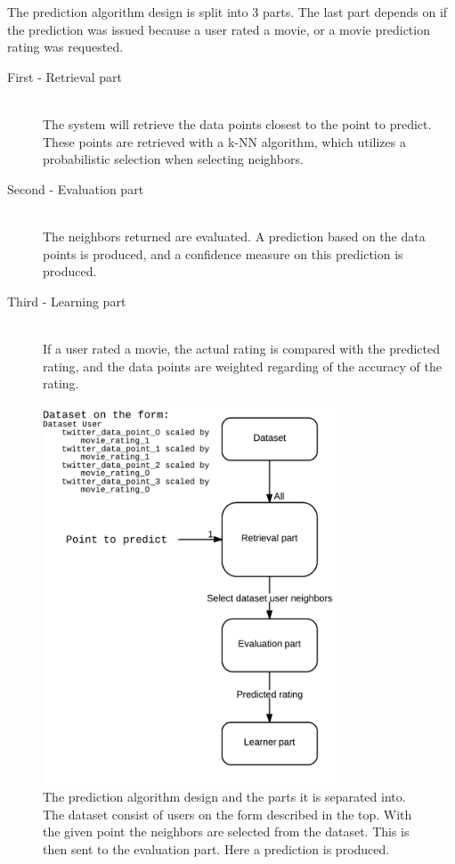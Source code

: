 The prediction algorithm design is split into 3 parts. The last part depends on if the prediction was issued because a user rated a movie, or a movie prediction rating was requested.

\begin{description}
    \item[First - Retrieval part] \hfill \\
    The system will retrieve the data points closest to the point to predict. These points are retrieved with a k-NN algorithm, which utilizes a probabilistic selection when selecting neighbors.

    \item[Second - Evaluation part] \hfill \\
    The neighbors returned are evaluated. A prediction based on the data points is produced, and a confidence measure on this prediction is produced.

    \item[Third - Learning part] \hfill \\
    If a user rated a movie, the actual rating is compared with the predicted rating, and the data points are weighted regarding of the accuracy of the rating.
\end{description}

\begin{figure}[H]
\centerline{\includegraphics[width=3.5in]{image/pred-alg.png}}
\caption[Prediction algorithm parts]{The prediction algorithm design and the parts it is separated into. The dataset consist of users on the form described in the top. With the given point the neighbors are selected from the dataset. This is then sent to the evaluation part. Here a prediction is produced.}
\label{figure:pred-alg}
\end{figure}
